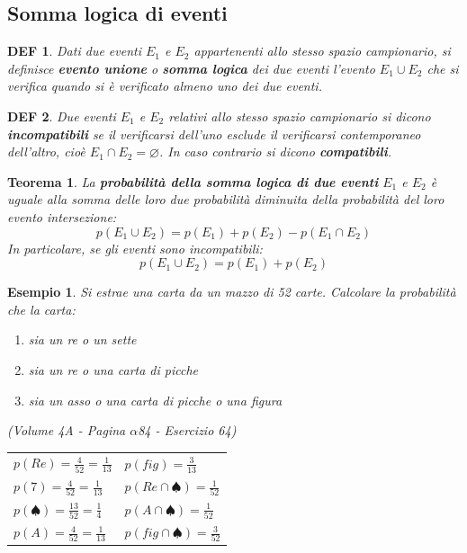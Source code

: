 \documentclass{article}     %
\newtheorem*{theorem}{Teorema}
\newtheorem*{definition}{DEF}
\newtheorem{ex}{Esempio}[section]
\begin{document}
            \subsection{Somma logica di eventi}
                \begin{definition}
                    Dati due eventi $E_1$ e $E_2$ appartenenti allo stesso spazio campionario, si definisce \textbf{evento unione} o \textbf{somma logica} dei due eventi l'evento $E_1 \cup E_2$ che si verifica quando si è verificato almeno uno dei due eventi. 
                \end{definition}
                \begin{definition}
                    Due eventi $E_1$ e $E_2$ relativi allo stesso spazio campionario si dicono \textbf{incompatibili} se il verificarsi dell'uno esclude il verificarsi contemporaneo dell'altro, cioè $E_1\cap E_2=\varnothing$. In caso contrario si dicono \textbf{compatibili}. 
                \end{definition}
                \begin{theorem}
                    La \textbf{probabilità della somma logica di due eventi} $E_1$ e $E_2$ è uguale alla somma delle loro due probabilità diminuita della probabilità del loro evento intersezione:
                    \[p(E_1\cup E_2)=p(E_1)+p(E_2)-p(E_1\cap E_2)\]
                    In particolare, se gli eventi sono \textit{incompatibili}:
                    \[p(E_1\cup E_2)=p(E_1)+p(E_2)\]
                \end{theorem}
                \begin{ex}
                    Si estrae una carta da un mazzo di 52 carte. Calcolare la probabilità che la carta:
                    \begin{enumerate}
                        \item sia un re o un sette
                        \item sia un re o una carta di picche
                        \item sia un asso o una carta di picche o una figura
                    \end{enumerate}
                    (Volume 4A - Pagina $\alpha$84 - Esercizio 64)
                \end{ex}

                \begin{tabular}{p{}p{}}
                    $p(Re)=\frac{4}{52}=\frac{1}{13}$ & $p(fig)=\frac{3}{13}$\\
                    $p(7)=\frac{4}{52}=\frac{1}{13}$ & $p(Re\cap \spadesuit)=\frac{1}{52}$\\
                    $p(\spadesuit)=\frac{13}{52}=\frac{1}{4}$& $p(A\cap \spadesuit)=\frac{1}{52}$\\
                    $p(A)=\frac{4}{52}=\frac{1}{13}$ & $p(fig \cap \spadesuit)=\frac{3}{52}$\\
                \end{tabular}\\
\end{document}

